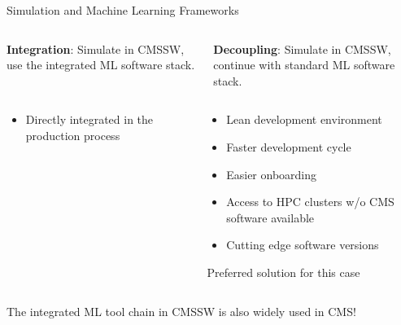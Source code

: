 \documentclass[lualatex,handout,aspectratio=1610]{beamer}
\begin{document}
\begin{frame}{Simulation and Machine Learning Frameworks}
	\begin{columns}
		\begin{column}{.5\textwidth}
			\textbf{Integration}: Simulate in CMSSW, use the integrated ML software stack.
		\end{column}
		\begin{column}{.5\textwidth}
			\textbf{Decoupling}: Simulate in CMSSW, continue with standard ML software stack.
		\end{column}
	\end{columns}
	\pause
	\begin{columns}
		\begin{column}{.5\textwidth}
			\begin{itemize}
				\item Directly integrated in the production process\pause
			\end{itemize}
		\end{column}
		\begin{column}{.5\textwidth}
			\begin{itemize}
				\item Lean development environment\pause
				\item Faster development cycle\pause
				\item Easier onboarding\pause
				\item Access to HPC clusters w/o CMS software available\pause
				\item Cutting edge software versions \pause
			\end{itemize}
			\imp Preferred solution for this case
		\end{column}
	\end{columns}

	\vfill
	\pause
	\begin{center}
		The integrated ML tool chain in CMSSW is also widely used in CMS!
	\end{center}
\end{frame}
\end{document}
